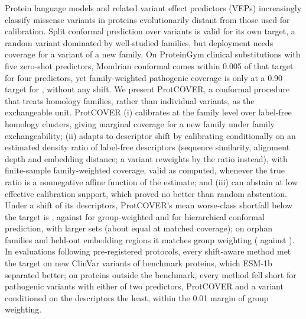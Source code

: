 Protein language models and related variant effect predictors (VEPs) increasingly classify missense variants in proteins evolutionarily distant from those used for calibration. Split conformal prediction over variants is valid for its own target, a random variant dominated by well-studied families, but deployment needs coverage for a variant of a new family. On ProteinGym clinical substitutions with five zero-shot predictors, Mondrian conformal comes within 0.005 of that target for four predictors, yet family-weighted pathogenic coverage is only \sOneBtwoPath{} at a 0.90 target for \sOneBtwoNBelow{}, without any shift.
We present ProtCOVER, a conformal procedure that treats homology families, rather than individual variants, as the exchangeable unit. ProtCOVER (i) calibrates at the family level over label-free homology clusters, giving marginal coverage for a new family under family exchangeability; (ii) adapts to descriptor shift by calibrating conditionally on an estimated density ratio of label-free descriptors (sequence similarity, alignment depth and embedding distance; a variant reweights by the ratio instead), with finite-sample family-weighted coverage, valid as computed, whenever the true ratio is a nonnegative affine function of the estimate; and (iii) can abstain at low effective calibration support, which proved no better than random abstention.
Under a shift of its descriptors, ProtCOVER's mean worse-class shortfall below the target is \shortCrTwoMean{}, against \shortGwcpTwoMean{} for group-weighted and \shortHcpTwoMean{} for hierarchical conformal prediction, with larger sets (about equal at matched coverage); on orphan families and held-out embedding regions it matches group weighting (\shortCrIndMean{} against \shortGwcpIndMean{}). In evaluations following pre-registered protocols, every shift-aware method met the target on new ClinVar variants of benchmark proteins, which ESM-1b separated better; on \unsNProt{} proteins outside the benchmark, every method fell short for pathogenic variants with either of two predictors, ProtCOVER and a variant conditioned on the descriptors the least, within the 0.01 margin of group weighting.
